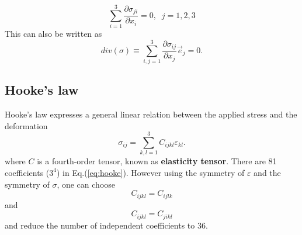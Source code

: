 %
\begin{equation}\label{eq:equilibrium}
  \sum_{i=1}^3 \frac{\partial\sigma_{ji}}{\partial x_i}=0, \;\; j=1,2,3
\end{equation}
%
This can also be written as
%
\begin{equation}
  div(\sigma)\equiv \sum_{i,j=1}^3\frac{\partial\sigma_{ij}}{\partial x_j}\vec e_j=0.
\end{equation}
%


\subsection{Hooke's law}

Hooke's law expresses a general linear relation between the applied
stress and the deformation
%
\begin{equation}\label{eq:hooke}
  \sigma_{ij}=\sum_{k,l=1}^3 C_{ijkl}\varepsilon_{kl}.
\end{equation}
%
where $C$ is a fourth-order tensor, known as {\bf elasticity tensor}.
There are 81 coefficients ($3^4$) in Eq.(\ref{eq:hooke}).  However
using the symmetry of $\varepsilon$ and the symmetry of $\sigma$, one
can choose
%
\begin{equation}
  C_{ijkl}=C_{ijlk}
\end{equation}
%
and
%
\begin{equation}
  C_{ijkl}=C_{jikl}
\end{equation}
%
and reduce the number of independent coefficients to 36.

